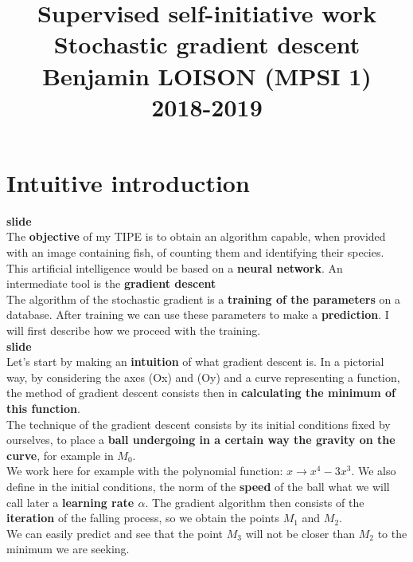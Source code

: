 \documentclass{article}
\begin{document}
	\title{Supervised self-initiative work\\
	\large Stochastic gradient descent
	  \\Benjamin LOISON (MPSI 1)
		\\2018-2019}
	\date{}
	\maketitle

	\section{Intuitive introduction}
	
		\textbf{slide}\\
		
		The \textbf{objective} of my TIPE is to obtain an algorithm capable, when provided with an image containing fish, of counting them and identifying their species. This artificial intelligence would be based on a \textbf{neural network}. An intermediate tool is the \textbf{gradient descent}\\
		The algorithm of the stochastic gradient is a \textbf{training of the parameters} on a database. After training we can use these parameters to make a \textbf{prediction}. I will first describe how we proceed with the training.\\
		
		\textbf{slide}\\
		
		Let's start by making an \textbf{intuition} of what gradient descent is. In a pictorial way, by considering the axes (Ox) and (Oy) and a curve representing a function, the method of gradient descent consists then in \textbf{calculating the minimum of this function}.\\
		The technique of the gradient descent consists by its initial conditions fixed by ourselves, to place a \textbf{ball undergoing in a certain way the gravity on the curve}, for example in $M_0$.\\
		We work here for example with the polynomial function: $x \longrightarrow x^4 - 3x^3$. We also define in the initial conditions, the norm of the \textbf{speed} of the ball what we will call later a \textbf{learning rate $\alpha$}. The gradient algorithm then consists of the \textbf{iteration} of the falling process, so we obtain the points $M_1$ and $M_2$.\\
		We can easily predict and see that the point $M_3$ will not be closer than $M_2$ to the minimum we are seeking.\\
		
\end{document}
